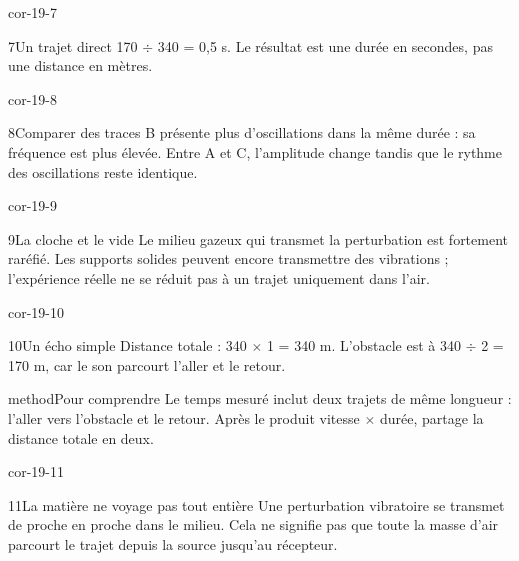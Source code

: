 \documentclass[12pt,twoside,openany]{book}
\begin{document}
\begin{blocLivre}{cor-19-7}
\begin{corrige}{7}{Un trajet direct}
170 \(\div\) 340 = 0,5 s. Le résultat est une durée en secondes, pas une distance en mètres.\par
\end{corrige}\end{blocLivre}
\begin{blocLivre}{cor-19-8}
\begin{corrige}{8}{Comparer des traces}
B présente plus d’oscillations dans la même durée : sa fréquence est plus élevée. Entre A et C, l’amplitude change tandis que le rythme des oscillations reste identique.\par
{}
\end{corrige}\end{blocLivre}
\begin{blocLivre}{cor-19-9}
\begin{corrige}{9}{La cloche et le vide}
Le milieu gazeux qui transmet la perturbation est fortement raréfié. Les supports solides peuvent encore transmettre des vibrations ; l’expérience réelle ne se réduit pas à un trajet uniquement dans l’air.\par
\end{corrige}\end{blocLivre}
\begin{blocLivre}{cor-19-10}
\begin{corrige}{10}{Un écho simple}
Distance totale : 340 \(\times\) 1 = 340 m. L’obstacle est à 340 \(\div\) 2 = 170 m, car le son parcourt l’aller et le retour.\par
\begin{pcEncadre}{method}{Pour comprendre}
Le temps mesuré inclut deux trajets de même longueur : l’aller vers l’obstacle et le retour. Après le produit vitesse \(\times\) durée, partage la distance totale en deux.\par
\end{pcEncadre}
\end{corrige}\end{blocLivre}
\begin{blocLivre}{cor-19-11}
\begin{corrige}{11}{La matière ne voyage pas tout entière}
Une perturbation vibratoire se transmet de proche en proche dans le milieu. Cela ne signifie pas que toute la masse d’air parcourt le trajet depuis la source jusqu’au récepteur.\par
\end{corrige}\end{blocLivre}
\end{document}
